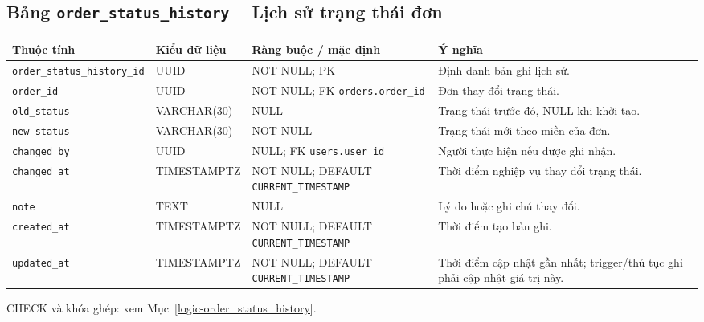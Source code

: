 \subsection{Bảng \texttt{order\_\allowbreak{}status\_\allowbreak{}history} -- Lịch sử trạng thái đơn}
\label{dictionary-order_status_history}
\begingroup
\footnotesize
\setlength{\tabcolsep}{3pt}
\begin{longtable}{>{\raggedright\arraybackslash}p{3.1cm}>{\raggedright\arraybackslash}p{2.5cm}>{\raggedright\arraybackslash}p{3.7cm}>{\raggedright\arraybackslash}p{4.3cm}}
\toprule
Thuộc tính & Kiểu dữ liệu & Ràng buộc / mặc định & Ý nghĩa \\
\midrule
\endhead
\texttt{order\_\allowbreak{}status\_\allowbreak{}history\_\allowbreak{}id} & UUID & NOT NULL; PK & Định danh bản ghi lịch sử. \\
\texttt{order\_\allowbreak{}id} & UUID & NOT NULL; FK \texttt{orders.order\_\allowbreak{}id} & Đơn thay đổi trạng thái. \\
\texttt{old\_\allowbreak{}status} & VARCHAR(30) & NULL & Trạng thái trước đó, NULL khi khởi tạo. \\
\texttt{new\_\allowbreak{}status} & VARCHAR(30) & NOT NULL & Trạng thái mới theo miền của đơn. \\
\texttt{changed\_\allowbreak{}by} & UUID & NULL; FK \texttt{users.user\_\allowbreak{}id} & Người thực hiện nếu được ghi nhận. \\
\texttt{changed\_\allowbreak{}at} & TIMESTAMPTZ & NOT NULL; DEFAULT \texttt{CURRENT\_\allowbreak{}TIMESTAMP} & Thời điểm nghiệp vụ thay đổi trạng thái. \\
\texttt{note} & TEXT & NULL & Lý do hoặc ghi chú thay đổi. \\
\texttt{created\_\allowbreak{}at} & TIMESTAMPTZ & NOT NULL; DEFAULT \texttt{CURRENT\_\allowbreak{}TIMESTAMP} & Thời điểm tạo bản ghi. \\
\texttt{updated\_\allowbreak{}at} & TIMESTAMPTZ & NOT NULL; DEFAULT \texttt{CURRENT\_\allowbreak{}TIMESTAMP} & Thời điểm cập nhật gần nhất; trigger/thủ tục ghi phải cập nhật giá trị này. \\
\bottomrule
\end{longtable}
\endgroup
CHECK và khóa ghép: xem Mục~\ref{logic-order_status_history}.
